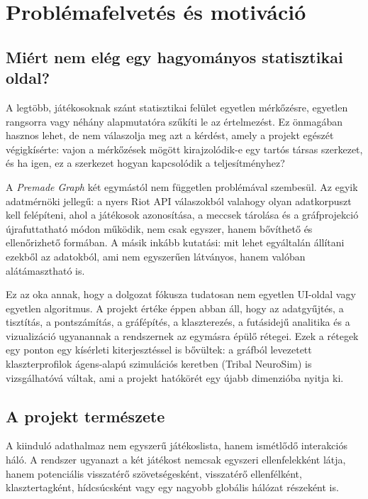 \chapter{Problémafelvetés és motiváció}

\section{Miért nem elég egy hagyományos statisztikai oldal?}

A legtöbb, játékosoknak szánt statisztikai felület egyetlen mérkőzésre, egyetlen rangsorra vagy néhány alapmutatóra szűkíti le az értelmezést. Ez önmagában hasznos lehet, de nem válaszolja meg azt a kérdést, amely a projekt egészét végigkísérte: vajon a mérkőzések mögött kirajzolódik-e egy tartós társas szerkezet, és ha igen, ez a szerkezet hogyan kapcsolódik a teljesítményhez?

A \emph{Premade Graph} két egymástól nem független problémával szembesül. Az egyik adatmérnöki jellegű: a nyers Riot API válaszokból valahogy olyan adatkorpuszt kell felépíteni, ahol a játékosok azonosítása, a meccsek tárolása és a gráfprojekció újrafuttatható módon működik, nem csak egyszer, hanem bővíthető és ellenőrizhető formában. A másik inkább kutatási: mit lehet egyáltalán állítani ezekből az adatokból, ami nem egyszerűen látványos, hanem valóban alátámasztható is.

Ez az oka annak, hogy a dolgozat fókusza tudatosan nem egyetlen UI-oldal vagy egyetlen algoritmus. A projekt értéke éppen abban áll, hogy az adatgyűjtés, a tisztítás, a pontszámítás, a gráfépítés, a klaszterezés, a futásidejű analitika és a vizualizáció ugyanannak a rendszernek az egymásra épülő rétegei. Ezek a rétegek egy ponton egy kísérleti kiterjesztéssel is bővültek: a gráfból levezetett klaszterprofilok ágens-alapú szimulációs keretben (Tribal NeuroSim) is vizsgálhatóvá váltak, ami a projekt hatókörét egy újabb dimenzióba nyitja ki.

\section{A projekt természete}

A kiinduló adathalmaz nem egyszerű játékoslista, hanem ismétlődő interakciós háló. A rendszer ugyanazt a két játékost nemcsak egyszeri ellenfelekként látja, hanem potenciális visszatérő szövetségesként, visszatérő ellenfélként, klasztertagként, hídcsúcsként vagy egy nagyobb globális hálózat részeként is.

